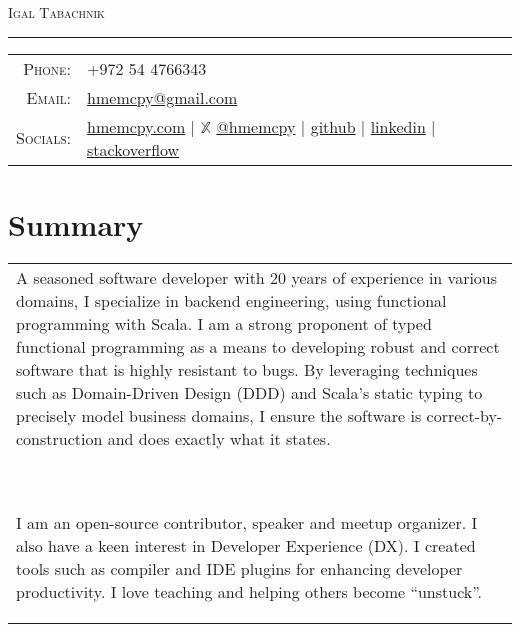 \documentclass[a4paper,11pt]{article}
\begin{document}
\par{\centering
		{\Huge \textsc{Igal Tabachnik}
	}\bigskip\par}

\hrule
\vspace{0.5em}
\begin{tabular}{rl}
  \textsc{Phone:}     & +972 54 4766343\\
  \textsc{Email:}     & \href{mailto:hmemcpy@gmail.com}{hmemcpy@gmail.com}\\
  \textsc{Socials:}   & \faHome{} \href{https://hmemcpy.com}{hmemcpy.com} 
                      | $\mathbb{X}$ \href{https://twitter.com/hmemcpy}{@hmemcpy}
                      | \faGithub{} \href{https://github.com/hmemcpy}{github}
                      | \faLinkedin{} \href{https://www.linkedin.com/in/igaltabachnik/}{linkedin}
                      | \faStackOverflow{} \href{https://stackoverflow.com/users/8205/igal-tabachnik}{stackoverflow}
\end{tabular}

\section{Summary}
\begin{tabular}{p{}}
  A seasoned software developer with 20 years of experience in various domains, I specialize in backend engineering, using functional programming with Scala. I am a strong proponent of typed functional programming as a means to developing robust and correct software that is highly resistant to bugs. By leveraging techniques such as Domain-Driven Design (DDD) and Scala's static typing to precisely model business domains, I ensure the software is correct-by-construction and does exactly what it states.\\\
  
  I am an open-source contributor, speaker and meetup organizer. I also have a keen interest in Developer Experience (DX). I created tools such as compiler and IDE plugins for enhancing developer productivity. I love teaching and helping others become ``unstuck''.
\end{tabular}
\end{document}
